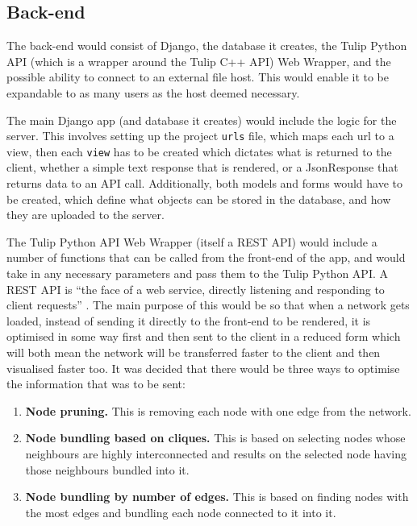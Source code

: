 \documentclass[../dissertation.tex]{subfiles}
\begin{document}
\subsection{Back-end}
\label{sec:overview-backend}

The back-end would consist of Django, the database it creates, the Tulip Python API (which is a wrapper around the Tulip C++ API) Web Wrapper, and the possible ability to connect to an external file host. This would enable it to be expandable to as many users as the host deemed necessary.

The main Django app (and database it creates) would include the logic for the server. This involves setting up the project \texttt{urls} file, which maps each url to a view, then each \texttt{view} has to be created which dictates what is returned to the client, whether a simple text response that is rendered, or a JsonResponse that returns data to an API call. Additionally, both models and forms would have to be created, which define what objects can be stored in the database, and how they are uploaded to the server.

The Tulip Python API Web Wrapper (itself a REST API) would include a number of functions that can be called from the front-end of the app, and would take in any necessary parameters and pass them to the Tulip Python API. A REST API is ``the face of a web service, directly listening and responding to client requests'' \cite{masse2011rest}. The main purpose of this would be so that when a network gets loaded, instead of sending it directly to the front-end to be rendered, it is optimised in some way first and then sent to the client in a reduced form which will both mean the network will be transferred faster to the client and then visualised faster too. It was decided that there would be three ways to optimise the information that was to be sent:
\begin{enumerate}
    \item \textbf{Node pruning.} This is removing each node with one edge from the network.
    \item \textbf{Node bundling based on cliques.} This is based on selecting nodes whose neighbours are highly interconnected and results on the selected node having those neighbours bundled into it.
    \item \textbf{Node bundling by number of edges.} This is based on finding nodes with the most edges and bundling each node connected to it into it.
\end{enumerate}
\end{document}
